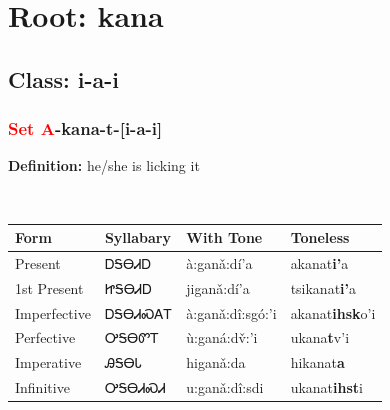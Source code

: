 \needspace{4in}
\section*{Root: kana}
\nopagebreak
{}
\needspace{3in}
\subsection*{Class: i-a-i}
\nopagebreak
\needspace{2in}
\subsubsection*{\textcolor{Red}{Set A}{-}\textbf{kana}{-}t{-}[i-a-i]}
\nopagebreak
\textbf{Definition: } he/she is licking it
\\[0.5em]
\begin{tabularx}{\textwidth}{l X X X}%
\toprule%
\textbf{Form}&\textbf{Syllabary}&\textbf{With Tone}&\textbf{Toneless}\\%
\midrule%
Present&ᎠᎦᎾᏗᎠ&à:ganǎ:dí’a&akanat\textbf{i'}a\\%
1st Present&ᏥᎦᎾᏗᎠ&jiganǎ:dí’a&tsikanat\textbf{i'}a\\%
Imperfective&ᎠᎦᎾᏗᏍᎪᎢ&à:ganǎ:dî:sgó:’i&akanat\textbf{ihsk}o'i\\%
Perfective&ᎤᎦᎾᏛᎢ&ù:ganá:dv̌:’i&ukana\textbf{t}v'i\\%
Imperative&ᎯᎦᎾᏓ&higanǎ:da&hikanat\textbf{a}\\%
Infinitive&ᎤᎦᎾᏗᏍᏗ&u:ganǎ:dî:sdi&ukanat\textbf{ihst}i\\%
\bottomrule%
\end{tabularx}
\\[1em]